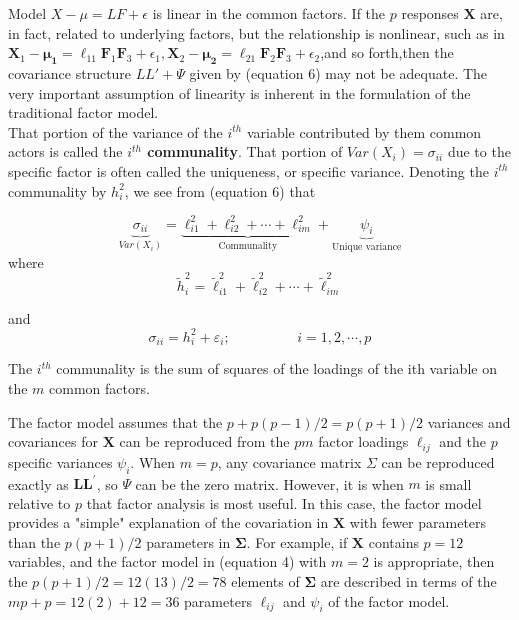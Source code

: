 \documentclass[12pt]{article}
\numberwithin{equation}{section}
\begin{document}
\noindent Model $X-\mu = LF + \epsilon $ is linear in the common factors. If the $p$ responses $\mathbf{X}$ are, in fact, related to underlying factors, but the relationship is nonlinear, such as in $\mathbf{ X}_1 -\boldsymbol{\mu_1}= \ell_{11}\mathbf{F}_1\mathbf{F}_3 + \epsilon_1, \mathbf{X}_2 -\boldsymbol{\mu_2}= \ell_{21}\mathbf{F}_2\mathbf{F}_3 + \epsilon_2$,and so forth,then the covariance structure $LL' + \Psi $ given by (equation 6) may not be adequate. The very important assumption of linearity is inherent in the formulation of the traditional factor model. \\

\noindent That portion of the variance of the $i^{th}$ variable contributed by them common actors is called the \textbf{$i^{th}$ communality}. That portion of $Var (X_i) = \sigma_{ii}$ due to the specific factor is often called the uniqueness, or specific variance. Denoting the $i^{th}$ communality by $h_i^2$, we see from (equation 6) that

\begin{equation}
	\underbrace{\sigma_{ii}}_{Var(X_i)}= \underbrace{\ell_{i1}^2 + \ell_{i2}^2 + \cdots +\ell_{im}^2}_\text{Communality} +\underbrace{\psi_i}_\text{Unique variance}
\end{equation}
where
$$
\widetilde{h}_i^2=\tilde{\ell}_{i 1}^2+\tilde{\ell}_{i 2}^2+\cdots+\tilde{\ell}_{i m}^2
$$

\noindent and 
$$\sigma_{ii}= h_i^2 + \varepsilon_i ; \hspace{2cm} i= 1,2, \cdots , p$$

\noindent The $i^{th}$ communality is the sum of squares of the loadings of the ith variable on the $m$ common factors.


\noindent The factor model assumes that the $p+p(p-1) / 2=p(p+1) / 2$ variances and covariances for $\mathbf{X}$ can be reproduced from the $p m$ factor loadings $\ell_{i j}$ and the $p$ specific variances $\psi_i$. When $m=p$, any covariance matrix $\Sigma$ can be reproduced exactly as $\mathbf{L} \mathbf{L}^{\prime}$, so $\Psi$ can be the zero matrix. However, it is when $m$ is small relative to $p$ that factor analysis is most useful. In this case, the factor model provides a "simple" explanation of the covariation in $\mathbf{X}$ with fewer parameters than the $p(p+1) / 2$ parameters in $\mathbf{\Sigma}$. For example, if $\mathbf{X}$ contains $p=12$ variables, and the factor model in (equation 4) with $m=2$ is appropriate, then the $p(p+1) / 2=12(13) / 2=78$ elements of $\mathbf{\Sigma}$ are described in terms of the $m p+p=12(2)+12=36$ parameters $\ell_{i j}$ and $\psi_i$ of the factor model.\\
\end{document}
